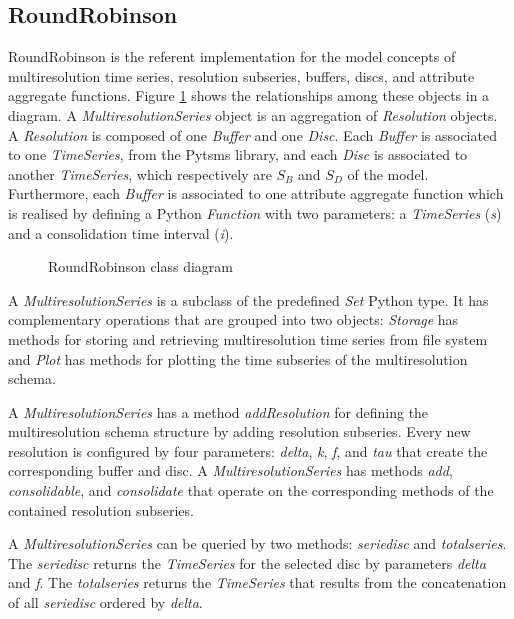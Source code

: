 \subsection{RoundRobinson}


RoundRobinson is the referent implementation for the model concepts of
multiresolution time series, resolution subseries, buffers, discs, and
attribute aggregate functions. Figure
\ref{fig:implementacio:roundrobinson-uml} shows the relationships
among these objects in a  diagram. A
\emph{MultiresolutionSeries} object is an aggregation of
\emph{Resolution} objects. A \emph{Resolution} is composed of one
\emph{Buffer} and one \emph{Disc}. Each \emph{Buffer} is associated to
one \emph{TimeSeries}, from the Pytsms library, and each \emph{Disc}
is associated to another \emph{TimeSeries}, which respectively are
$S_B$ and $S_D$ of the  model. Furthermore, each
\emph{Buffer} is associated to one attribute aggregate function which
is realised by defining a Python \emph{Function} with two parameters:
a \emph{TimeSeries} (\emph{s}) and a consolidation time interval
(\emph{i}).



\begin{figure}[tp]
  \centering
  
  \caption{RoundRobinson  class diagram}
  \label{fig:implementacio:roundrobinson-uml}
\end{figure}



A \emph{MultiresolutionSeries} is a subclass of the predefined \emph{Set} Python
type. It has complementary operations that are grouped into two
objects: \emph{Storage} has methods for storing and retrieving
multiresolution time series from file system and \emph{Plot} has
methods for plotting the time subseries of the multiresolution schema.


A \emph{MultiresolutionSeries} has a method \emph{addResolution} for defining
the multiresolution schema structure by adding resolution
subseries. Every new resolution is configured by four parameters:
\emph{delta}, \emph{k}, \emph{f}, and \emph{tau} that create the
corresponding buffer and disc.  A \emph{MultiresolutionSeries} has methods
\emph{add}, \emph{consolidable}, and \emph{consolidate} that operate on
the corresponding methods of the contained resolution subseries.


A \emph{MultiresolutionSeries} can be queried by two methods:
\emph{seriedisc} and \emph{totalseries}. The \emph{seriedisc} returns
the \emph{TimeSeries} for the selected disc by parameters \emph{delta}
and \emph{f}. The \emph{totalseries} returns the \emph{TimeSeries}
that results from the concatenation of all \emph{seriedisc} ordered by
\emph{delta}.

